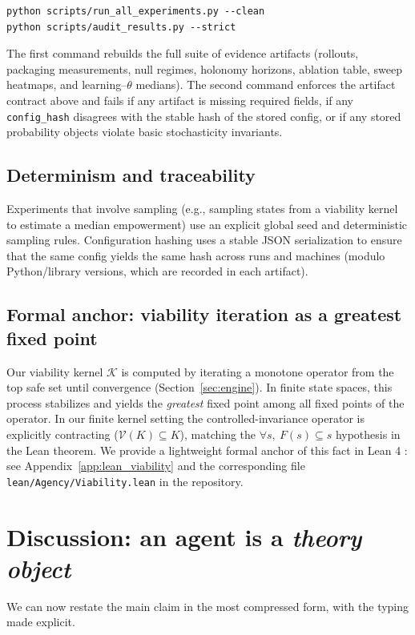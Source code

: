 \documentclass[11pt]{article}
\newcommand{\K}{\mathcal{K}}
\begin{document}
\begin{verbatim}
python scripts/run_all_experiments.py --clean
python scripts/audit_results.py --strict
\end{verbatim}

The first command rebuilds the full suite of evidence artifacts (rollouts, packaging measurements, null regimes, holonomy horizons, ablation table, sweep heatmaps, and learning--$\theta$ medians). The second command enforces the artifact contract above and fails if any artifact is missing required fields, if any \texttt{config\_hash} disagrees with the stable hash of the stored config, or if any stored probability objects violate basic stochasticity invariants.

\subsection{Determinism and traceability}
Experiments that involve sampling (e.g., sampling states from a viability kernel to estimate a median empowerment) use an explicit global seed and deterministic sampling rules. Configuration hashing uses a stable JSON serialization to ensure that the same config yields the same hash across runs and machines (modulo Python/library versions, which are recorded in each artifact).

\subsection{Formal anchor: viability iteration as a greatest fixed point}
Our viability kernel $\K$ is computed by iterating a monotone operator from the top safe set until convergence (Section~\ref{sec:engine}). In finite state spaces, this process stabilizes and yields the \emph{greatest} fixed point among all fixed points of the operator. In our finite kernel setting the controlled-invariance operator is explicitly contracting ($\mathcal{V}(K)\subseteq K$), matching the $\forall s,\ F(s)\subseteq s$ hypothesis in the Lean theorem. We provide a lightweight formal anchor of this fact in Lean 4 \citep{demoura2021lean4,mathlib2019}: see Appendix~\ref{app:lean_viability} and the corresponding file \texttt{lean/Agency/Viability.lean} in the repository.
 \section{Discussion: an agent is a \emph{theory object}}
\label{sec:discussion}

We can now restate the main claim in the most compressed form, with the typing made explicit.
\end{document}
